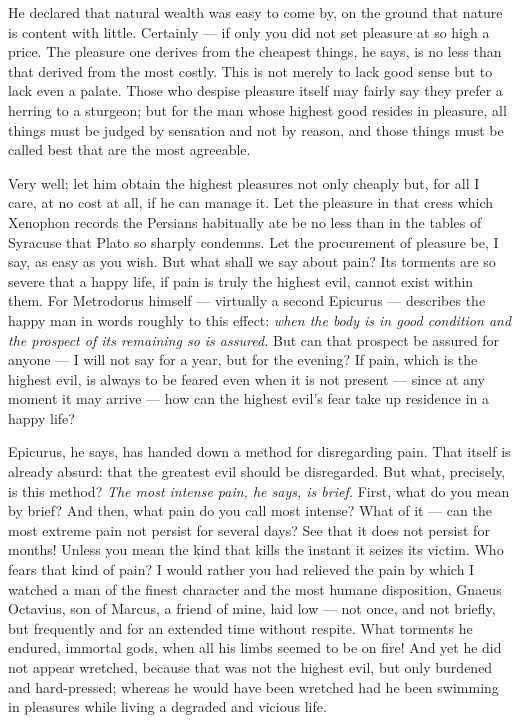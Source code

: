  He declared that natural wealth was easy to come by, on the ground that nature is content with little. Certainly — if only you did not set pleasure at so high a price. The pleasure one derives from the cheapest things, he says, is no less than that derived from the most costly. This is not merely to lack good sense but to lack even a palate. Those who despise pleasure itself may fairly say they prefer a herring to a sturgeon; but for the man whose highest good resides in pleasure, all things must be judged by sensation and not by reason, and those things must be called best that are the most agreeable.

 Very well; let him obtain the highest pleasures not only cheaply but, for all I care, at no cost at all, if he can manage it. Let the pleasure in that cress which Xenophon records the Persians habitually ate be no less than in the tables of Syracuse that Plato so sharply condemns. Let the procurement of pleasure be, I say, as easy as you wish. But what shall we say about pain? Its torments are so severe that a happy life, if pain is truly the highest evil, cannot exist within them. For Metrodorus himself — virtually a second Epicurus — describes the happy man in words roughly to this effect: \textit{when the body is in good condition and the prospect of its remaining so is assured.} But can that prospect be assured for anyone — I will not say for a year, but for the evening? If pain, which is the highest evil, is always to be feared even when it is not present — since at any moment it may arrive — how can the highest evil's fear take up residence in a happy life?

 Epicurus, he says, has handed down a method for disregarding pain. That itself is already absurd: that the greatest evil should be disregarded. But what, precisely, is this method? \textit{The most intense pain, he says, is brief.} First, what do you mean by brief? And then, what pain do you call most intense? What of it — can the most extreme pain not persist for several days? See that it does not persist for months! Unless you mean the kind that kills the instant it seizes its victim. Who fears that kind of pain? I would rather you had relieved the pain by which I watched a man of the finest character and the most humane disposition, Gnaeus Octavius, son of Marcus, a friend of mine, laid low — not once, and not briefly, but frequently and for an extended time without respite. What torments he endured, immortal gods, when all his limbs seemed to be on fire! And yet he did not appear wretched, because that was not the highest evil, but only burdened and hard-pressed; whereas he would have been wretched had he been swimming in pleasures while living a degraded and vicious life.

